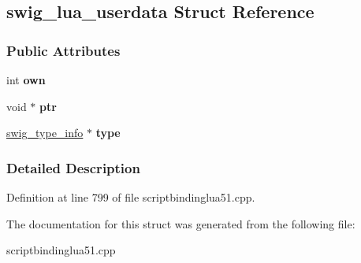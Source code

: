 \hypertarget{structswig__lua__userdata}{
\subsection{swig\_\-lua\_\-userdata Struct Reference}
\label{structswig__lua__userdata}
}
\subsubsection*{Public Attributes}
\begin{DoxyCompactItemize}
\item 
\hypertarget{structswig__lua__userdata_a12970d19b437f84b1e7fba18ede882cb}{
int {\bfseries own}}
\label{structswig__lua__userdata_a12970d19b437f84b1e7fba18ede882cb}

\item 
\hypertarget{structswig__lua__userdata_a2d3be052ee0b81986ab31ef5dc08fd25}{
void $\ast$ {\bfseries ptr}}
\label{structswig__lua__userdata_a2d3be052ee0b81986ab31ef5dc08fd25}

\item 
\hypertarget{structswig__lua__userdata_aed83344d96f9da7bf57f9bb604cb1d53}{
\hyperlink{structswig__type__info}{swig\_\-type\_\-info} $\ast$ {\bfseries type}}
\label{structswig__lua__userdata_aed83344d96f9da7bf57f9bb604cb1d53}

\end{DoxyCompactItemize}


\subsubsection{Detailed Description}


Definition at line 799 of file scriptbindinglua51.cpp.



The documentation for this struct was generated from the following file:\begin{DoxyCompactItemize}
\item 
scriptbindinglua51.cpp\end{DoxyCompactItemize}
